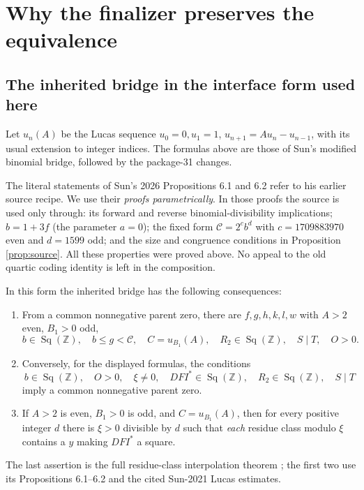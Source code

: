 \documentclass[11pt]{article}
\newcommand{\Z}{\mathbb Z}
\newcommand{\Sq}{\operatorname{Sq}}
\newcommand{\capC}{\mathscr C}
\theoremstyle{definition}
\theoremstyle{remark}
\numberwithin{equation}{section}
\begin{document}
\section{Why the finalizer preserves the equivalence}
\label{sec:finalproof}

\subsection{The inherited bridge in the interface form used here}

Let \(u_n(A)\) be the Lucas sequence \(u_0=0,u_1=1\),
\(u_{n+1}=Au_n-u_{n-1}\), with its usual extension to integer indices.
The formulas above are those of Sun's modified binomial bridge, followed
by the package-31 changes.

The literal statements of Sun's 2026 Propositions 6.1 and 6.2 refer to
his earlier source recipe. We use their \emph{proofs parametrically}.
In those proofs the source is used only through: its forward and reverse
binomial-divisibility implications; \(b=1+3f\) (the parameter \(a=0\));
the fixed form \(\capC=2^c b^d\) with \(c=1709883970\) even and \(d=1599\)
odd; and the size and congruence conditions
in Proposition \ref{prop:source}. All these properties were proved above.
No appeal to the old quartic coding identity is left in the composition.

In this form the inherited bridge has the following consequences:
\begin{enumerate}
\item From a common nonnegative parent zero, there are
\(f,g,h,k,l,w\) with \(A>2\) even, \(B_1>0\) odd,
\[
 b\in\Sq(\Z),\quad b\le g<\capC,\quad
 C=u_{B_1}(A),\quad R_2\in\Sq(\Z),\quad S\mid T,\quad O>0.
\]
\item Conversely, for the displayed formulas, the conditions
\[
 b\in\Sq(\Z),\quad O>0,\quad \xi\ne0,\quad
 DFI^*\in\Sq(\Z),\quad R_2\in\Sq(\Z),\quad S\mid T
\]
imply a common nonnegative parent zero.
\item If \(A>2\) is even, \(B_1>0\) is odd, and \(C=u_{B_1}(A)\), then
for every positive integer \(d\) there is \(\xi>0\) divisible by \(d\)
such that \emph{each} residue class modulo \(\xi\) contains a \(y\)
making \(DFI^*\) a square.
\end{enumerate}
The last assertion is the full residue-class interpolation theorem
\cite[Theorem 4.1]{sun2026}; the first two use its Propositions 6.1--6.2
and the cited Sun-2021 Lucas estimates.
\end{document}
